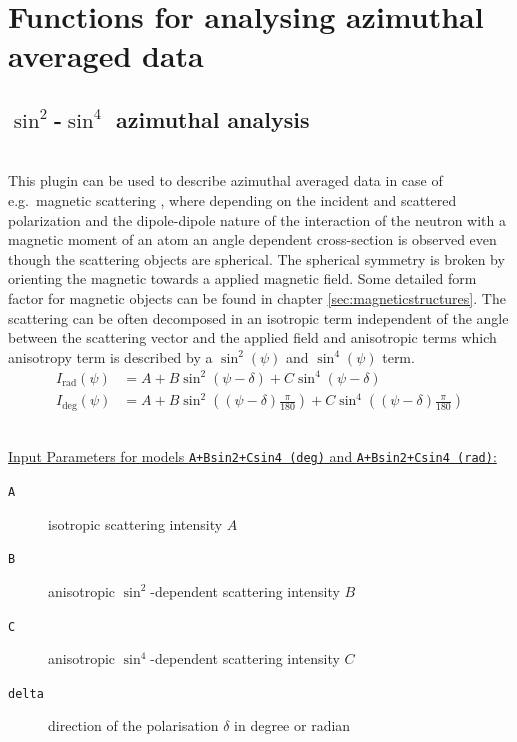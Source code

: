 \clearpage
\section{Functions for analysing azimuthal averaged data}



\subsection{$\sin^2$-$\sin^4$ azimuthal analysis} ~\\
This plugin can be used to describe azimuthal averaged data in case of e.g.\ magnetic scattering \cite{Wiedenmann2011}, where depending on the incident and scattered polarization and the dipole-dipole nature of the interaction of the neutron with a magnetic moment of an atom an angle dependent cross-section is observed even though the scattering objects are spherical. The spherical symmetry is broken by orienting the magnetic towards a applied magnetic field. Some detailed form factor for magnetic objects can be found in chapter \ref{sec:magneticstructures}. The scattering can be often decomposed in an isotropic term independent of the angle between the scattering vector and the applied field and anisotropic terms which anisotropy term is described by a $\sin^2(\psi)$ and $\sin^4(\psi)$ term.
\begin{align}
I_\mathrm{rad}(\psi) &= A + B\sin^2(\psi-\delta) + C \sin^4(\psi-\delta) \\
I_\mathrm{deg}(\psi) &= A + B\sin^2\left((\psi-\delta)\frac{\pi}{180}\right) + C \sin^4\left((\psi-\delta)\frac{\pi}{180}\right)
\end{align}

\hspace{1pt}\\
\underline{Input Parameters for models \texttt{A+Bsin2+Csin4 (deg)} and \texttt{A+Bsin2+Csin4 (rad)}:}\\
\begin{description}
\item[\texttt{A}] isotropic scattering intensity $A$
\item[\texttt{B}] anisotropic $\sin^2$-dependent scattering intensity $B$
\item[\texttt{C}] anisotropic $\sin^4$-dependent scattering intensity $C$
\item[\texttt{delta}] direction of the polarisation $\delta$ in degree or radian
\end{description}

